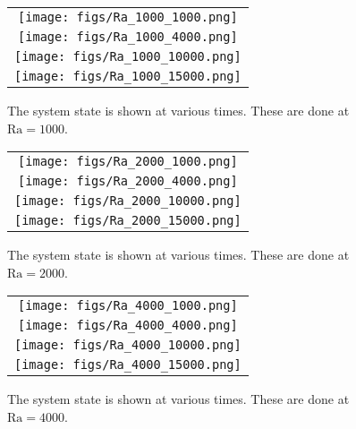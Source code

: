 \documentclass{article}
\begin{document}
\begin{figure}[!h]
\centering
\begin{tabular}{c}
\texttt{[image: figs/Ra\_1000\_1000.png]} \\
\texttt{[image: figs/Ra\_1000\_4000.png]} \\
\texttt{[image: figs/Ra\_1000\_10000.png]} \\
\texttt{[image: figs/Ra\_1000\_15000.png]} \\
\end{tabular}
\caption{The system state is shown at various times. These are done at $\mathrm{Ra} = 1000$.}
\label{fig:Ra1}

\end{figure}
\begin{figure}[!h]
\centering
\begin{tabular}{c}
\texttt{[image: figs/Ra\_2000\_1000.png]} \\
\texttt{[image: figs/Ra\_2000\_4000.png]} \\
\texttt{[image: figs/Ra\_2000\_10000.png]} \\
\texttt{[image: figs/Ra\_2000\_15000.png]} \\
\end{tabular}
\caption{The system state is shown at various times. These are done at $\mathrm{Ra} = 2000$.}
\label{fig:Ra2}
\end{figure}

\begin{figure}[!h]
\centering
\begin{tabular}{c}
\texttt{[image: figs/Ra\_4000\_1000.png]} \\
\texttt{[image: figs/Ra\_4000\_4000.png]} \\
\texttt{[image: figs/Ra\_4000\_10000.png]} \\
\texttt{[image: figs/Ra\_4000\_15000.png]} \\
\end{tabular}
\caption{The system state is shown at various times. These are done at $\mathrm{Ra} = 4000$.}
\label{fig:Ra4}
\end{figure}

\clearpage
\end{document}
